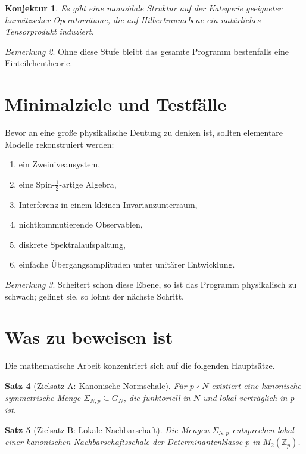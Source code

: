 \documentclass[12pt,a4paper]{article}
\theoremstyle{plain}
\newtheorem{satz}{Satz}[section]
\newtheorem{konjektur}[satz]{Konjektur}
\theoremstyle{definition}
\theoremstyle{remark}
\newtheorem{bemerkung}[satz]{Bemerkung}
\newcommand{\Zp}{\mathbb Z_p}
\begin{document}
	\begin{konjektur}
		Es gibt eine monoidale Struktur auf der Kategorie geeigneter hurwitzscher Operatorräume,
		die auf Hilbertraumebene ein natürliches Tensorprodukt induziert.
	\end{konjektur}
	
	\begin{bemerkung}
		Ohne diese Stufe bleibt das gesamte Programm bestenfalls eine Einteilchentheorie.
	\end{bemerkung}
	
	\section{Minimalziele und Testfälle}
	
	Bevor an eine große physikalische Deutung zu denken ist, sollten elementare Modelle
	rekonstruiert werden:
	
	\begin{enumerate}
		\item ein Zweiniveausystem,
		\item eine Spin-\(\frac12\)-artige Algebra,
		\item Interferenz in einem kleinen Invarianzunterraum,
		\item nichtkommutierende Observablen,
		\item diskrete Spektralaufspaltung,
		\item einfache Übergangsamplituden unter unitärer Entwicklung.
	\end{enumerate}
	
	\begin{bemerkung}
		Scheitert schon diese Ebene, so ist das Programm physikalisch zu schwach; gelingt sie,
		so lohnt der nächste Schritt.
	\end{bemerkung}
	
	\section{Was zu beweisen ist}
	
	Die mathematische Arbeit konzentriert sich auf die folgenden Hauptsätze.
	
	\begin{satz}[Zielsatz A: Kanonische Normschale]
		Für \(p\nmid N\) existiert eine kanonische symmetrische Menge \(\Sigma_{N,p}\subseteq G_N\),
		die funktoriell in \(N\) und lokal verträglich in \(p\) ist.
	\end{satz}
	
	\begin{satz}[Zielsatz B: Lokale Nachbarschaft]
		Die Mengen \(\Sigma_{N,p}\) entsprechen lokal einer kanonischen Nachbarschaftsschale der
		Determinantenklasse \(p\) in \(M_2(\Zp)\).
	\end{satz}
	
\end{document}
